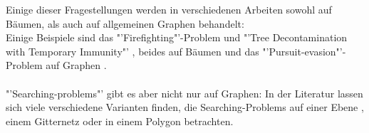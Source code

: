 Einige dieser Fragestellungen werden in verschiedenen Arbeiten sowohl auf Bäumen, als auch auf allgemeinen Graphen behandelt:\\
Einige Beispiele sind das "'Firefighting"'-Problem und "'Tree Decontamination with Temporary Immunity"' \cite{tdti_paper}, beides auf Bäumen \cite{firefighterproblem_paper} und das "'Pursuit-evasion"'-Problem auf Graphen \cite{graph_paper_76}.
\\
\\
"'Searching-problems"' gibt es aber nicht nur auf Graphen: In der Literatur lassen sich viele verschiedene  Varianten finden, die Searching-Problems auf einer Ebene \cite{klein_paper}, einem Gitternetz \cite{grid_paper_96} oder in einem Polygon \cite{polygon_paper} betrachten.

